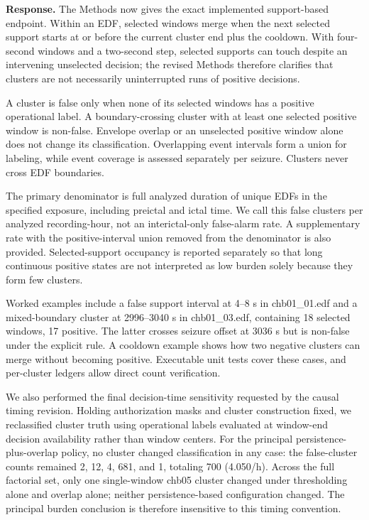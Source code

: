 \documentclass[11pt,a4paper]{article}
\begin{document}
\textbf{Response.} The Methods now gives the exact implemented support-based endpoint. Within an EDF, selected windows merge when the next selected support starts at or before the current cluster end plus the cooldown. With four-second windows and a two-second step, selected supports can touch despite an intervening unselected decision; the revised Methods therefore clarifies that clusters are not necessarily uninterrupted runs of positive decisions.

A cluster is false only when none of its selected windows has a positive operational label. A boundary-crossing cluster with at least one selected positive window is non-false. Envelope overlap or an unselected positive window alone does not change its classification. Overlapping event intervals form a union for labeling, while event coverage is assessed separately per seizure. Clusters never cross EDF boundaries.

The primary denominator is full analyzed duration of unique EDFs in the specified exposure, including preictal and ictal time. We call this false clusters per analyzed recording-hour, not an interictal-only false-alarm rate. A supplementary rate with the positive-interval union removed from the denominator is also provided. Selected-support occupancy is reported separately so that long continuous positive states are not interpreted as low burden solely because they form few clusters.

Worked examples include a false support interval at 4--8 s in chb01\_01.edf and a mixed-boundary cluster at 2996--3040 s in chb01\_03.edf, containing 18 selected windows, 17 positive. The latter crosses seizure offset at 3036 s but is non-false under the explicit rule. A cooldown example shows how two negative clusters can merge without becoming positive. Executable unit tests cover these cases, and per-cluster ledgers allow direct count verification.

We also performed the final decision-time sensitivity requested by the causal timing revision. Holding authorization masks and cluster construction fixed, we reclassified cluster truth using operational labels evaluated at window-end decision availability rather than window centers. For the principal persistence-plus-overlap policy, no cluster changed classification in any case: the false-cluster counts remained 2, 12, 4, 681, and 1, totaling 700 (4.050/h). Across the full factorial set, only one single-window chb05 cluster changed under thresholding alone and overlap alone; neither persistence-based configuration changed. The principal burden conclusion is therefore insensitive to this timing convention.
\end{document}
